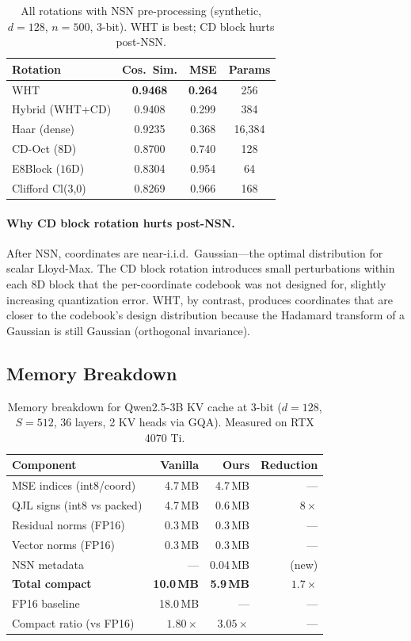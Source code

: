 \documentclass[sigconf,anonymous,review]{acmart}
\begin{document}
\begin{table}[t]
\centering
\caption{All rotations with NSN pre-processing (synthetic, $d=128$,
$n=500$, 3-bit). WHT is best; CD block hurts post-NSN.}
\label{tab:rotations-nsn}
\begin{tabular}{lccc}
\toprule
Rotation & Cos.\ Sim. & MSE & Params \\
\midrule
WHT               & \textbf{0.9468} & \textbf{0.264} & 256 \\
Hybrid (WHT+CD)   & 0.9408 & 0.299 & 384 \\
Haar (dense)       & 0.9235 & 0.368 & 16{,}384 \\
CD-Oct ($8$D)      & 0.8700 & 0.740 & 128 \\
E8Block ($16$D)    & 0.8304 & 0.954 & 64 \\
Clifford Cl(3,0)   & 0.8269 & 0.966 & 168 \\
\bottomrule
\end{tabular}
\end{table}

\paragraph{Why CD block rotation hurts post-NSN.}
After NSN, coordinates are near-i.i.d.\ Gaussian---the optimal
distribution for scalar Lloyd-Max. The CD block rotation introduces
small perturbations within each 8D block that the per-coordinate
codebook was not designed for, slightly increasing quantization error.
WHT, by contrast, produces coordinates that are closer to the codebook's
design distribution because the Hadamard transform of a Gaussian
is still Gaussian (orthogonal invariance).

\subsection{Memory Breakdown}

\begin{table}[t]
\centering
\caption{Memory breakdown for Qwen2.5-3B KV cache at 3-bit ($d=128$,
$S=512$, 36 layers, 2 KV heads via GQA). Measured on RTX 4070 Ti.}
\label{tab:memory}
\begin{tabular}{lrrr}
\toprule
Component & Vanilla & Ours & Reduction \\
\midrule
MSE indices (int8/coord) & 4.7\,MB & 4.7\,MB & --- \\
QJL signs (int8 vs packed) & 4.7\,MB & 0.6\,MB & $8\times$ \\
Residual norms (FP16) & 0.3\,MB & 0.3\,MB & --- \\
Vector norms (FP16) & 0.3\,MB & 0.3\,MB & --- \\
NSN metadata & --- & 0.04\,MB & (new) \\
\midrule
\textbf{Total compact} & \textbf{10.0\,MB} & \textbf{5.9\,MB} & $\mathbf{1.7\times}$ \\
FP16 baseline & 18.0\,MB & --- & --- \\
Compact ratio (vs FP16) & $1.80\times$ & $\mathbf{3.05\times}$ & --- \\
\bottomrule
\end{tabular}
\end{table}
\end{document}
